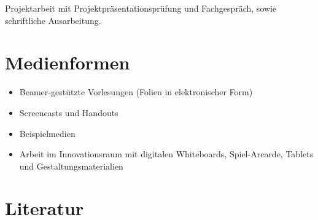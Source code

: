 Projektarbeit mit Projektpräsentationsprüfung und Fachgespräch, sowie
schriftliche Ausarbeitung.

\section*{Medienformen\label{/mi-2017/modulbeschreibungen-bachelor/BA_Vertiefung_SocialComputing}}\label{medienformenpathlabelmi-2017modulbeschreibungen-bachelorbaux5fvertiefungux5fsocialcomputing}

\begin{itemize}
\tightlist
\item
  Beamer-gestützte Vorlesungen (Folien in elektronischer Form)
\item
  Screencasts und Handouts
\item
  Beispielmedien
\item
  Arbeit im Innovationsraum mit digitalen Whiteboards, Spiel-Arcarde,
  Tablets und Gestaltungsmaterialien
\end{itemize}

\section*{Literatur\label{/mi-2017/modulbeschreibungen-bachelor/BA_Vertiefung_SocialComputing}}\label{literaturpathlabelmi-2017modulbeschreibungen-bachelorbaux5fvertiefungux5fsocialcomputing}

